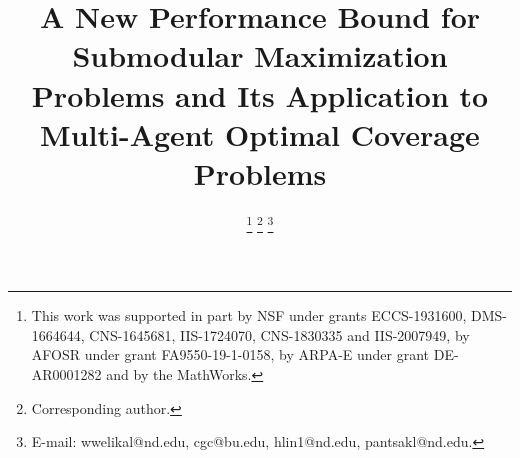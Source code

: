 \documentclass[conference]{IEEEtran}
\begin{document}
\title{{\LARGE \textbf{
A New Performance Bound for Submodular Maximization Problems and Its Application to Multi-Agent Optimal Coverage Problems
}}}

\author{



\thanks{This work was supported in part by NSF under grants ECCS-1931600, DMS-1664644, CNS-1645681, IIS-1724070, CNS-1830335 and IIS-2007949, by AFOSR under grant FA9550-19-1-0158, by ARPA-E under grant DE-AR0001282 and by the MathWorks.
}
\thanks{ Corresponding author.}
\thanks{E-mail: wwelikal@nd.edu, cgc@bu.edu, hlin1@nd.edu, pantsakl@nd.edu.}}
\maketitle
\end{document}
